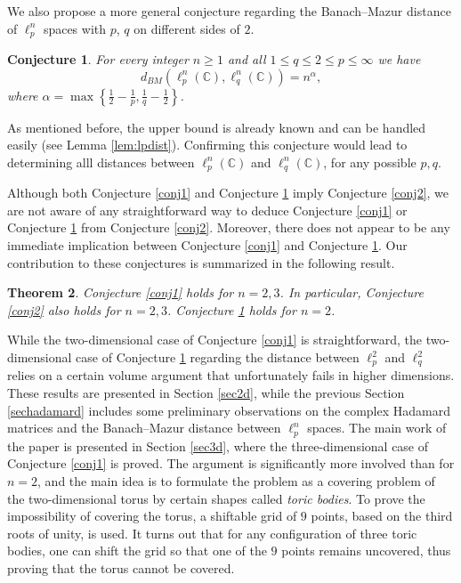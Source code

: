 \documentclass[12pt, a4paper]{article}
\theoremstyle{plain} %
\newtheorem{theorem}{Theorem}[section] %
\newtheorem{conjecture}[theorem]{Conjecture}
\theoremstyle{definition} %
\theoremstyle{remark} %
\begin{document}
We also propose a more general conjecture regarding the Banach--Mazur distance of $\ell_p^n$ spaces with $p$, $q$ on different sides of $2$.

\begin{conjecture}
\label{conj3}
For every integer $n \geq 1$ and all $1 \leq q \leq 2 \leq p \leq \infty$ we have
\begin{equation}
\label{lpupbound}
d_{BM}(\ell_{p}^n(\mathbb{C}), \ell_{q}^n(\mathbb{C})) = n^{\alpha},
\end{equation}
where $\alpha = \max \left \{ \frac{1}{2}-\frac{1}{p}, \frac{1}{q}-\frac{1}{2} \right \}$.
\end{conjecture}

As mentioned before, the upper bound is already known and can be handled easily (see Lemma \ref{lem:lpdist}). Confirming this conjecture would lead to determining alll distances between $\ell_p^n(\mathbb{C})$ and $\ell_q^n(\mathbb{C})$, for any possible $p, q$.

Although both Conjecture \ref{conj1} and Conjecture \ref{conj3} imply Conjecture \ref{conj2}, we are not aware of any straightforward way to deduce Conjecture \ref{conj1} or Conjecture \ref{conj3} from Conjecture \ref{conj2}. Moreover, there does not appear to be any immediate implication between Conjecture \ref{conj1} and Conjecture \ref{conj3}. Our contribution to these conjectures is summarized in the following result.
\begin{theorem}
Conjecture \ref{conj1} holds for $n = 2, 3$. In particular, Conjecture \ref{conj2} also holds for $n=2, 3$. Conjecture \ref{conj3} holds for $n=2$.
\end{theorem}

While the two-dimensional case of Conjecture \ref{conj1} is straightforward, the two-dimensional case of Conjecture \ref{conj3} regarding the distance between $\ell_p^2$ and $\ell_q^2$ relies on a certain volume argument that unfortunately fails in higher dimensions. These results are presented in Section \ref{sec2d}, while the previous Section \ref{sechadamard} includes some preliminary observations on the complex Hadamard matrices and the Banach--Mazur distance between $\ell_p^n$ spaces. The main work of the paper is presented in Section \ref{sec3d}, where the three-dimensional case of Conjecture \ref{conj1} is proved. The argument is significantly more involved than for $n=2$, and the main idea is to formulate the problem as a covering problem of the two-dimensional torus by certain shapes called \emph{toric bodies}. To prove the impossibility of covering the torus, a shiftable grid of $9$ points, based on the third roots of unity, is used. It turns out that for any configuration of three toric bodies, one can shift the grid so that one of the $9$ points remains uncovered, thus proving that the torus cannot be covered.
\end{document}
